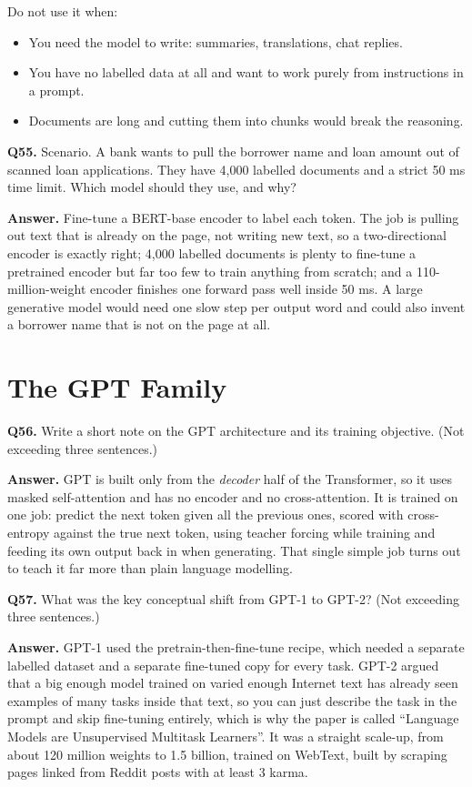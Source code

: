 \documentclass[11pt]{article}
\begin{document}
Do not use it when:
\begin{itemize}
  \item You need the model to write: summaries, translations, chat replies.
  \item You have no labelled data at all and want to work purely from instructions in a prompt.
  \item Documents are long and cutting them into chunks would break the reasoning.
\end{itemize}

\medskip
\textbf{Q55.} Scenario. A bank wants to pull the borrower name and loan amount out of scanned
loan applications. They have 4{,}000 labelled documents and a strict 50 ms time limit. Which
model should they use, and why?

\textbf{Answer.} Fine-tune a BERT-base encoder to label each token. The job is pulling out
text that is already on the page, not writing new text, so a two-directional encoder is
exactly right; 4{,}000 labelled documents is plenty to fine-tune a pretrained encoder but far
too few to train anything from scratch; and a 110-million-weight encoder finishes one forward
pass well inside 50 ms. A large generative model would need one slow step per output word and
could also invent a borrower name that is not on the page at all.

\section{The GPT Family}

\textbf{Q56.} Write a short note on the GPT architecture and its training objective. (Not
exceeding three sentences.)

\textbf{Answer.} GPT is built only from the \emph{decoder} half of the Transformer, so it uses
masked self-attention and has no encoder and no cross-attention. It is trained on one job:
predict the next token given all the previous ones, scored with cross-entropy against the true
next token, using teacher forcing while training and feeding its own output back in when
generating. That single simple job turns out to teach it far more than plain language
modelling.

\medskip
\textbf{Q57.} What was the key conceptual shift from GPT-1 to GPT-2? (Not exceeding three
sentences.)

\textbf{Answer.} GPT-1 used the pretrain-then-fine-tune recipe, which needed a separate
labelled dataset and a separate fine-tuned copy for every task. GPT-2 argued that a big enough
model trained on varied enough Internet text has already seen examples of many tasks inside
that text, so you can just describe the task in the prompt and skip fine-tuning entirely,
which is why the paper is called ``Language Models are Unsupervised Multitask Learners''. It
was a straight scale-up, from about 120 million weights to 1.5 billion, trained on WebText,
built by scraping pages linked from Reddit posts with at least 3 karma.
\end{document}
